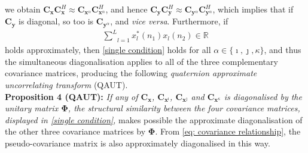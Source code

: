 \documentclass[review]{elsarticle}
\theoremstyle{plain}
\theoremstyle{remark}
\theoremstyle{plain}
\theoremstyle{definition}
\theoremstyle{prop}
\theoremstyle{definition}
\theoremstyle{plain}
\theoremstyle{plain}
\newcommand\numberthis{\addtocounter{equation}{1}\tag{\theequation}}
\begin{document}
we obtain $\mathbf{C}_{\mathbf{x}}\mathbf{C}_{\mathbf{x}}^H\approx\mathbf{C}_{\mathbf{x}^\alpha}\mathbf{C}_{\mathbf{x}^\alpha}^H$, and hence $\mathbf{C}_{\mathbf{y}}\mathbf{C}_{\mathbf{y}}^H\approx\mathbf{C}_{\mathbf{y}^\alpha}\mathbf{C}_{\mathbf{y}^\alpha}^H$, which implies that if $\mathbf{C}_{\mathbf{y}}$ is diagonal, so too is $\mathbf{C}_{\mathbf{y}^\alpha}$, and \emph{vice versa}. Furthermore, if 
\begin{equation}\label{approximation}
\begin{split}
\underset{l=1}{\overset{L}{\sum}}x_{l}^{*}(n_1)x_{l}(n_2)\in \mathbb{R}
\end{split}
\end{equation} 
holds approximately, then \eqref{single condition} holds for all $\alpha \in \{ \imath, \jmath, \kappa \}$, and thus the simultaneous diagonalisation applies to all of the three complementary covariance matrices, producing the following \emph{quaternion approximate uncorrelating transform} (QAUT). 
\\\textbf{Proposition 4 (QAUT):}
\emph{If any of $\mathbf{C}_{\mathbf{x}}$, $\mathbf{C}_{\mathbf{x}^\imath}$,
$\mathbf{C}_{\mathbf{x}^\jmath}$ and $\mathbf{C}_{\mathbf{x}^\kappa}$ is diagonalised by the unitary matrix $\mathbf{\Phi}$, the structural similarity between the four covariance matrices, displayed in \eqref{single condition},} makes possible the approximate diagonalisation of the other three covariance matrices by $\mathbf{\Phi}$. From \eqref{eq: covariance relationship}, the pseudo-covariance matrix is also approximately diagonalised in this way.
\end{document}
